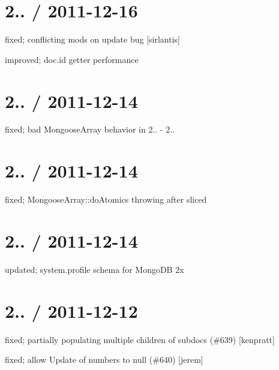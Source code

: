 \section*{2.. / 2011-\/12-\/16 }


\begin{DoxyItemize}
\item fixed; conflicting mods on update bug \mbox{[}sirlantis\mbox{]}
\item improved; doc.\+id getter performance
\end{DoxyItemize}

\section*{2.. / 2011-\/12-\/14 }


\begin{DoxyItemize}
\item fixed; bad Mongoose\+Array behavior in 2.. -\/ 2..
\end{DoxyItemize}

\section*{2.. / 2011-\/12-\/14 }


\begin{DoxyItemize}
\item fixed; Mongoose\+Array\+::do\+Atomics throwing after sliced
\end{DoxyItemize}

\section*{2.. / 2011-\/12-\/14 }


\begin{DoxyItemize}
\item updated; system.\+profile schema for Mongo\+DB 2x
\end{DoxyItemize}

\section*{2.. / 2011-\/12-\/12 }


\begin{DoxyItemize}
\item fixed; partially populating multiple children of subdocs (\#639) \mbox{[}kenpratt\mbox{]}
\item fixed; allow Update of numbers to null (\#640) \mbox{[}jerem\mbox{]}
\end{DoxyItemize}


